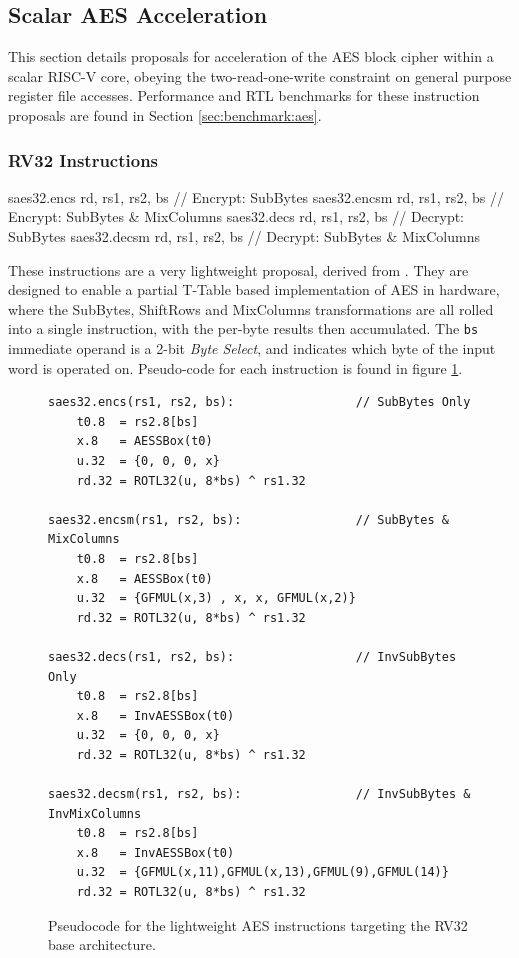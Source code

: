 
\newpage
\subsection{Scalar AES Acceleration}

This section details proposals for acceleration of
the AES block cipher \cite{nist:fips:197} within a scalar RISC-V core,
obeying the two-read-one-write constraint on general purpose register
file accesses.
Performance and RTL benchmarks for these
instruction proposals are found in Section
\ref{sec:benchmark:aes}.

\subsubsection{RV32 Instructions}

\begin{cryptoisa}
saes32.encs      rd, rs1, rs2, bs // Encrypt: SubBytes
saes32.encsm     rd, rs1, rs2, bs // Encrypt: SubBytes & MixColumns
saes32.decs      rd, rs1, rs2, bs // Decrypt: SubBytes
saes32.decsm     rd, rs1, rs2, bs // Decrypt: SubBytes & MixColumns
\end{cryptoisa}

These instructions are a very lightweight proposal, derived from
\cite{MJS:20}.
They are designed to enable a partial T-Table based implementation
of AES in hardware, where the SubBytes, ShiftRows and MixColumns
transformations are all rolled into a single instruction, with the
per-byte results then accumulated.
The {\tt bs} immediate operand is a 2-bit {\em Byte Select}, and indicates
which byte of the input word is operated on.
Pseudo-code for each instruction is found in figure
\ref{fig:pseudo:aes:rv32}.

\begin{figure}[h]
\begin{lstlisting}[language=pseudo]
saes32.encs(rs1, rs2, bs):                 // SubBytes Only
    t0.8  = rs2.8[bs]
    x.8   = AESSBox(t0)
    u.32  = {0, 0, 0, x}
    rd.32 = ROTL32(u, 8*bs) ^ rs1.32

saes32.encsm(rs1, rs2, bs):                // SubBytes & MixColumns
    t0.8  = rs2.8[bs]
    x.8   = AESSBox(t0)
    u.32  = {GFMUL(x,3) , x, x, GFMUL(x,2)}
    rd.32 = ROTL32(u, 8*bs) ^ rs1.32

saes32.decs(rs1, rs2, bs):                 // InvSubBytes Only
    t0.8  = rs2.8[bs]
    x.8   = InvAESSBox(t0)
    u.32  = {0, 0, 0, x}
    rd.32 = ROTL32(u, 8*bs) ^ rs1.32

saes32.decsm(rs1, rs2, bs):                // InvSubBytes & InvMixColumns
    t0.8  = rs2.8[bs]
    x.8   = InvAESSBox(t0)
    u.32  = {GFMUL(x,11),GFMUL(x,13),GFMUL(9),GFMUL(14)}
    rd.32 = ROTL32(u, 8*bs) ^ rs1.32
\end{lstlisting}
\caption{Pseudocode for the lightweight AES instructions targeting the
RV32 base architecture.}
\label{fig:pseudo:aes:rv32}
\end{figure}



